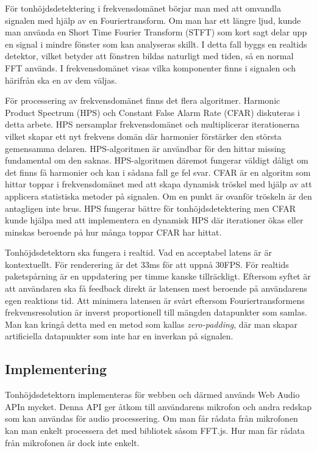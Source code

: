 För tonhöjdsdetektering i frekvensdomänet börjar man med att omvandla signalen med hjälp av en Fouriertransform. Om man har ett längre ljud, kunde man använda en Short Time Fourier Transform (STFT) som kort sagt delar upp en signal i mindre fönster som kan analyseras skillt. I detta fall byggs en realtids detektor, vilket betyder att fönstren bildas naturligt med tiden, så en normal FFT används. I frekvensdomänet visas vilka komponenter finns i signalen och härifrån ska en av dem väljas.

För processering av frekvensdomänet finns det flera algoritmer. Harmonic Product Spectrum (HPS) och Constant False Alarm Rate (CFAR) diskuteras i detta arbete. HPS nersamplar frekvensdomänet och multiplicerar iterationerna vilket skapar ett nyt frekvens domän där harmonier förstärker den största gemensamma delaren. HPS-algoritmen är användbar för den hittar missing fundamental om den saknas. HPS-algoritmen däremot fungerar väldigt dåligt om det finns få harmonier och kan i sådana fall ge fel svar. CFAR är en algoritm som hittar toppar i frekvensdomänet med att skapa dynamisk tröskel med hjälp av att applicera statistiska metoder på signalen. Om en punkt är ovanför tröskeln är den antagligen inte brus. HPS fungerar bättre för tonhöjdsdetektering men CFAR kunde hjälpa med att implementera en dynamisk HPS där iterationer ökas eller minskas beroende på hur många toppar CFAR har hittat. 

Tonhöjdsdetektorn ska fungera i realtid. Vad en acceptabel latens är är kontextuellt. För renderering är det 33ms för att uppnå 30FPS. För realtids paketspårning är en uppdatering per timme kanske tillräckligt. Eftersom syftet är att användaren ska få feedback direkt är latensen mest beroende på användarens egen reaktions tid. Att minimera latensen är svårt eftersom Fouriertransformens frekvensresolution är inverst proportionell till mängden datapunkter som samlas. Man kan kringå detta med en metod som kallas \textit{zero-padding}, där man skapar artificiella datapunkter som inte har en inverkan på signalen. 

\subsection*{Implementering}
Tonhöjdsdetektorn implementeras för webben och därmed används Web Audio APIn mycket. Denna API ger åtkom till användarens mikrofon och andra redskap som kan användas för audio processering. Om man får rådata från mikrofonen kan man enkelt processera det med bibliotek såsom FFT.js. Hur man får rådata från mikrofonen är dock inte enkelt. 

